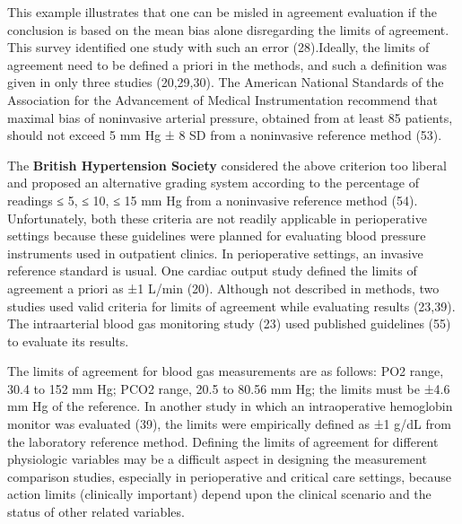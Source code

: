 \documentclass[]{article}
\begin{document}
This example illustrates that one can be misled in agreement evaluation if the conclusion is based on the mean bias alone disregarding the limits of agreement. This survey identified one study with such an error (28).Ideally, the limits of agreement need to be defined a priori in the methods, and such a definition was given in only three studies (20,29,30). The American National Standards of the Association for the Advancement of Medical Instrumentation recommend that maximal bias of noninvasive arterial pressure, obtained from at least 85 patients, should not exceed 5 mm Hg ± 8 SD from a noninvasive reference method (53). 

The \textbf{British Hypertension Society} considered the above criterion too liberal and proposed an alternative grading system according to the percentage of readings ≤ 5, ≤ 10, ≤ 15 mm Hg from a noninvasive reference method (54). Unfortunately, both these criteria are not readily applicable in perioperative settings because these guidelines were planned for evaluating blood pressure instruments used in outpatient clinics. In perioperative settings, an invasive reference standard is usual. One cardiac output study defined the limits of agreement a priori as ±1 L/min (20). Although not described in methods, two studies used valid criteria for limits of agreement while evaluating results (23,39). The intraarterial blood gas monitoring study (23) used published guidelines (55) to evaluate its results. 

The limits of agreement for blood gas measurements are as follows: PO2 range, 30.4 to 152 mm Hg; PCO2 range, 20.5 to 80.56 mm Hg; the limits must be ±4.6 mm Hg of the reference. In another study in which an intraoperative hemoglobin monitor was evaluated (39), the limits were empirically defined as ±1 g/dL from the laboratory reference method. Defining the limits of agreement for different physiologic variables may be a difficult aspect in designing the measurement comparison studies, especially in perioperative and critical care settings, because action limits (clinically important) depend upon the clinical scenario and the status of other related variables. 
\end{document}
